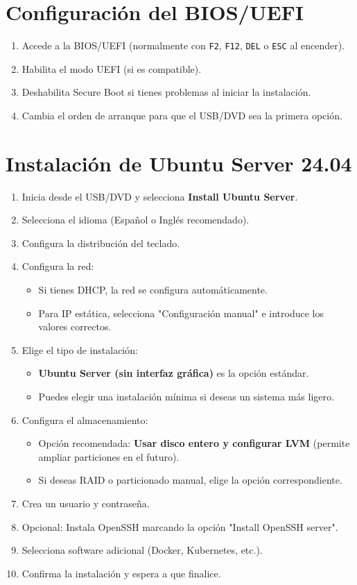 \documentclass{article}
\begin{document}
\section{Configuración del BIOS/UEFI}
\begin{enumerate}
    \item Accede a la BIOS/UEFI (normalmente con \texttt{F2}, \texttt{F12}, \texttt{DEL} o \texttt{ESC} al encender).
    \item Habilita el modo UEFI (si es compatible).
    \item Deshabilita Secure Boot si tienes problemas al iniciar la instalación.
    \item Cambia el orden de arranque para que el USB/DVD sea la primera opción.
\end{enumerate}

\section{Instalación de Ubuntu Server 24.04}
\begin{enumerate}
    \item Inicia desde el USB/DVD y selecciona \textbf{Install Ubuntu Server}.
    \item Selecciona el idioma (Español o Inglés recomendado).
    \item Configura la distribución del teclado.
    \item Configura la red:
    \begin{itemize}
        \item Si tienes DHCP, la red se configura automáticamente.
        \item Para IP estática, selecciona "Configuración manual" e introduce los valores correctos.
    \end{itemize}
    \item Elige el tipo de instalación:
    \begin{itemize}
        \item \textbf{Ubuntu Server (sin interfaz gráfica)} es la opción estándar.
        \item Puedes elegir una instalación mínima si deseas un sistema más ligero.
    \end{itemize}
    \item Configura el almacenamiento:
    \begin{itemize}
        \item Opción recomendada: \textbf{Usar disco entero y configurar LVM} (permite ampliar particiones en el futuro).
        \item Si deseas RAID o particionado manual, elige la opción correspondiente.
    \end{itemize}
    \item Crea un usuario y contraseña.
    \item Opcional: Instala OpenSSH marcando la opción "Install OpenSSH server".
    \item Selecciona software adicional (Docker, Kubernetes, etc.).
    \item Confirma la instalación y espera a que finalice.
\end{enumerate}
\end{document}
